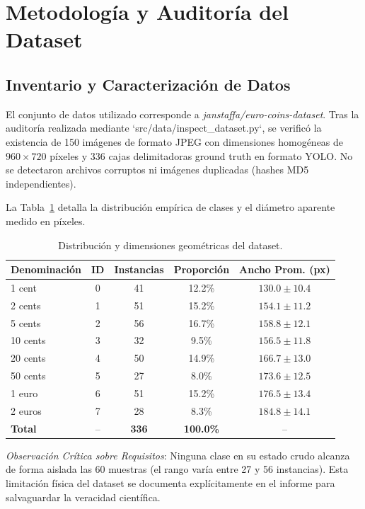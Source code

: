 \documentclass[journal,compsoc,twoside]{IEEEtran}
\begin{document}
\section{Metodología y Auditoría del Dataset}

\subsection{Inventario y Caracterización de Datos}
El conjunto de datos utilizado corresponde a \textit{janstaffa/euro-coins-dataset}. Tras la auditoría realizada mediante `src/data/inspect_dataset.py`, se verificó la existencia de 150 imágenes de formato JPEG con dimensiones homogéneas de $960 \times 720$ píxeles y 336 cajas delimitadoras ground truth en formato YOLO. No se detectaron archivos corruptos ni imágenes duplicadas (hashes MD5 independientes).

La Tabla~\ref{tab:dataset_summary} detalla la distribución empírica de clases y el diámetro aparente medido en píxeles.

\begin{table}[htbp]
\caption{Distribución y dimensiones geométricas del dataset.}
\label{tab:dataset_summary}
\centering
\begin{tabular}{lcccc}
\toprule
\textbf{Denominación} & \textbf{ID} & \textbf{Instancias} & \textbf{Proporción} & \textbf{Ancho Prom. (px)} \\
\midrule
1 cent   & 0 & 41 & 12.2\% & $130.0 \pm 10.4$ \\
2 cents  & 1 & 51 & 15.2\% & $154.1 \pm 11.2$ \\
5 cents  & 2 & 56 & 16.7\% & $158.8 \pm 12.1$ \\
10 cents & 3 & 32 & 9.5\%  & $156.5 \pm 11.8$ \\
20 cents & 4 & 50 & 14.9\% & $166.7 \pm 13.0$ \\
50 cents & 5 & 27 & 8.0\%  & $173.6 \pm 12.5$ \\
1 euro   & 6 & 51 & 15.2\% & $176.5 \pm 13.4$ \\
2 euros  & 7 & 28 & 8.3\%  & $184.8 \pm 14.1$ \\
\bottomrule
\textbf{Total} & -- & \textbf{336} & \textbf{100.0\%} & -- \\
\bottomrule
\end{tabular}
\end{table}

\textit{Observación Crítica sobre Requisitos}: Ninguna clase en su estado crudo alcanza de forma aislada las 60 muestras (el rango varía entre 27 y 56 instancias). Esta limitación física del dataset se documenta explícitamente en el informe para salvaguardar la veracidad científica.
\end{document}
